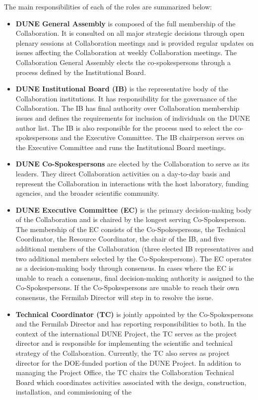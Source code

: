 The main responsibilities of each of the roles are summarized below:
\begin{itemize}
 \item \textbf{DUNE General Assembly} is composed of the full membership of the Collaboration.  It is consulted on all major strategic decisions through open plenary sessions at Collaboration meetings and is provided regular updates on issues affecting the Collaboration at weekly Collaboration meetings.  The Collaboration General Assembly elects the co-spokespersons through a process defined by the Institutional Board.
\item \textbf{DUNE Institutional Board (IB)} is the representative body of the Collaboration institutions. It has responsibility for the governance of the Collaboration. The IB has final authority over Collaboration membership issues and defines the requirements for inclusion of individuals on the DUNE author list. The IB is also responsible for the process used to select the co-spokespersons and the Executive Committee.  The IB chairperson serves on the Executive Committee and runs the Institutional Board meetings.
\item \textbf{DUNE Co-Spokespersons} are elected by the Collaboration to serve as its leaders.  They direct Collaboration activities on a day-to-day basis and represent the Collaboration in interactions with the host laboratory, funding agencies, and the broader scientific community.
\item \textbf{DUNE Executive Committee (EC)} is the primary decision-making body of the Collaboration and is chaired by the longest serving Co-Spokesperson.  The membership of the EC consists of the Co-Spokespersons, the Technical Coordinator, the Resource Coordinator, the chair of the IB, and five additional members of the Collaboration (three elected IB representatives and two additional members selected by the Co-Spokespersons).  The EC operates as a decision-making body through consensus.  In cases where the EC is unable to reach a consensus, final decision-making authority is assigned to the Co-Spokespersons.  If the Co-Spokespersons are unable to reach their own consensus, the Fermilab Director will step in to resolve the issue.
\item \textbf{Technical Coordinator (TC)} is jointly appointed by the Co-Spokespersons and the Fermilab Director and has reporting responsibilities to both.  In the context of the international DUNE Project, the TC serves as the project director 
and is responsible for implementing the scientific and technical strategy of the Collaboration.  Currently, the TC also serves as project director for the DOE-funded portion of the DUNE Project.  In addition to managing the Project Office, the TC chairs the Collaboration Technical Board which coordinates activities associated with the design, construction, installation, and commissioning of the %

\end{itemize}
